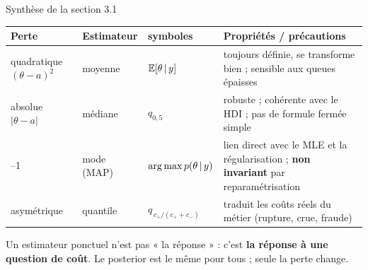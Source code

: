 \begin{frame}{Synthèse de la section 3.1}
\begin{center}
{\small
\begin{tabular}{@{}p{}p{}p{}p{}@{}}
\toprule
\textbf{Perte} & \textbf{Estimateur} & \textbf{symboles} & \textbf{Propriétés / précautions} \\
\midrule
quadratique $(\theta-a)^2$ & moyenne & $\mathbb{E}[\theta \,\vert\, y]$ &
toujours définie, se transforme bien ; sensible aux queues épaisses \\
\addlinespace
absolue $|\theta-a|$ & médiane & $q_{0{,}5}$ &
robuste ; cohérente avec le HDI ; pas de formule fermée simple \\
\addlinespace
0--1 & mode (MAP) & $\operatorname*{arg\,max} p(\theta \,\vert\, y)$ &
lien direct avec le MLE et la régularisation ; \textbf{non invariant} par
reparamétrisation \\
\addlinespace
asymétrique & quantile & $q_{\,c_+/(c_++c_-)}$ &
traduit les coûts réels du métier (rupture, crue, fraude) \\
\bottomrule
\end{tabular}}
\end{center}
\vspace{1.5mm}
\begin{kbox}
Un estimateur ponctuel n'est pas « la réponse » : c'est \textbf{la réponse à une
question de coût}. Le posterior est le même pour tous ; seule la perte change.
\end{kbox}
\end{frame}

